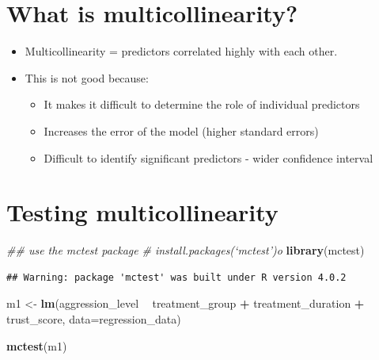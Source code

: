 \documentclass[
]{book}
\newenvironment{Shaded}{\begin{snugshade}}{\end{snugshade}}
\newcommand{\CommentTok}[1]{\textcolor[rgb]{0.56,0.35,0.01}{\textit{#1}}}
\newcommand{\DataTypeTok}[1]{\textcolor[rgb]{0.13,0.29,0.53}{#1}}
\newcommand{\KeywordTok}[1]{\textcolor[rgb]{0.13,0.29,0.53}{\textbf{#1}}}
\newcommand{\NormalTok}[1]{#1}
\newcommand{\OperatorTok}[1]{\textcolor[rgb]{0.81,0.36,0.00}{\textbf{#1}}}
\newcommand{\StringTok}[1]{\textcolor[rgb]{0.31,0.60,0.02}{#1}}
\providecommand{\tightlist}{%
  \setlength{\itemsep}{0pt}\setlength{\parskip}{0pt}}
\begin{document}
\hypertarget{what-is-multicollinearity}{%
\section{What is multicollinearity?}\label{what-is-multicollinearity}}

\begin{itemize}
\tightlist
\item
  Multicollinearity = predictors correlated highly with each other.
\item
  This is not good because:

  \begin{itemize}
  \tightlist
  \item
    It makes it difficult to determine the role of individual predictors
  \item
    Increases the error of the model (higher standard errors)
  \item
    Difficult to identify significant predictors - wider confidence interval
  \end{itemize}
\end{itemize}

\hypertarget{testing-multicollinearity}{%
\section{Testing multicollinearity}\label{testing-multicollinearity}}

\begin{Shaded}
\begin{Highlighting}[]
\CommentTok{## use the mctest package}
\CommentTok{# install.packages(‘mctest’)o}
\KeywordTok{library}\NormalTok{(mctest)}
\end{Highlighting}
\end{Shaded}

\begin{verbatim}
## Warning: package 'mctest' was built under R version 4.0.2
\end{verbatim}

\begin{Shaded}
\begin{Highlighting}[]
\NormalTok{m1 <-}\StringTok{ }\KeywordTok{lm}\NormalTok{(aggression_level }\OperatorTok{~}\StringTok{ }\NormalTok{treatment_group }\OperatorTok{+}\StringTok{ }\NormalTok{treatment_duration }\OperatorTok{+}\StringTok{ }\NormalTok{trust_score, }\DataTypeTok{data=}\NormalTok{regression_data)}

\KeywordTok{mctest}\NormalTok{(m1) }
\end{Highlighting}
\end{Shaded}
\end{document}
